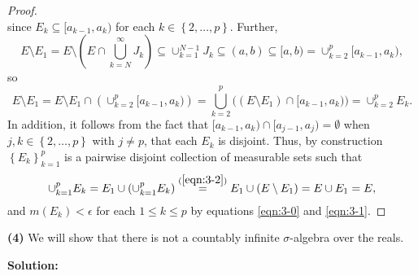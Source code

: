 \documentclass[12pt]{article}
\begin{document}
\begin{proof}
\begin{equation}
\label{eqn:3-1}
\end{equation}
since $E_{k} \subseteq [a_{k-1}, a_{k})$ for each $k \in \left\{ 2, \dots, p \right\}$. 
Further, 
\[ E \setminus E_{1} = E \setminus \left( E\cap \bigcup_{k=N}^{\infty}J_{k} \right) \subseteq \cup_{k=1}^{N-1}J_{k} \subseteq (a, b) \subseteq [a,b)
 = \cup_{k=2}^{p}[a_{k-1}, a_{k}), \]
so 
\begin{equation}
E\setminus E_{1} = E\setminus E_{1} \cap \left( \cup_{k=2}^{p}[a_{k-1},a_{k}) \right) = \bigcup_{k=2}^{p}\bigg((E\setminus E_{1})\cap [a_{k-1},
a_{k})\bigg) = \cup_{k=2}^{p}E_{k}. 
\label{eqn:3-2}
\end{equation}
In addition, it follows from the fact that $[a_{k-1}, a_{k}) \cap [a_{j-1}, a_{j}) = \emptyset$ when $j,k \in \left\{ 2,\dots, p \right\}$ with $j
\neq p$, that each $E_{k}$ is disjoint. Thus, by construction $\left\{ E_{k} \right\}_{k=1}^{p}$ is a pairwise disjoint collection of measurable sets such that 
\[ \cup_{k=1}^{p}E_{k} = E_{1}\cup \left( \cup_{k=1}^{p}E_{k} \right) \stackrel{(\ref{eqn:3-2})}{=} E_{1} \cup \left( E\setminus
E_{1} \right) = E\cup E_{1} = E, \]
and $m(E_{k}) < \epsilon$ for each $1 \leq k \leq p$ by equations \ref{eqn:3-0} and \ref{eqn:3-1}.
\end{proof}

{\bf (4)} We will show that there is not a countably infinite $\sigma$-algebra over the reals.

{\bf Solution:}
\end{document}
